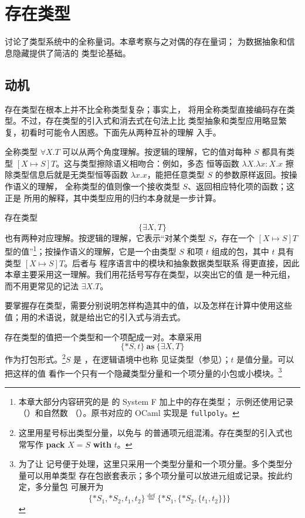 
\chapter{存在类型}
\label{chap:24}

讨论了类型系统中的全称量词。本章考察与之对偶的存在量词；
为数据抽象和信息隐藏提供了简洁的
类型论基础。

\section{动机}
\label{sec:24.1}

存在类型在根本上并不比全称类型复杂；事实上，
将用全称类型直接编码存在类型。不过，存在类型的引入式和消去式在句法上比
类型抽象和类型应用略显繁复，初看时可能令人困惑。下面先从两种互补的理解
入手。

全称类型 \(\forall X.T\) 可以从两个角度理解。按逻辑的理解，它的值对每种
\(S\) 都具有类型 \([X\mapsto S]T\)。这与类型擦除语义相吻合：例如，多态
恒等函数 \(\lambda X.\lambda x:X.x\) 擦除类型信息后就是无类型恒等函数
\(\lambda x.x\)，能把任意类型 \(S\) 的参数原样返回。按操作语义的理解，
全称类型的值则像一个接收类型 \(S\)、返回相应特化项的函数；这正是
所用的解释，其中类型应用的归约本身就是一步计算。

存在类型
\[
\{\exists X,T\}
\]
也有两种对应理解。按逻辑的理解，它表示“对某个类型 \(S\)，存在一个
\([X\mapsto S]T\) 型的值”\footnote{本章大部分内容研究的是
的 System F 加上中的存在类型；
示例还使用记录（）和自然数
（）。原书对应的
OCaml 实现是 \texttt{fullpoly}。}；按操作语义的理解，它是一个由类型
\(S\) 和项 \(t\) 组成的包，其中 \(t\) 具有类型 \([X\mapsto S]T\)。后者与
程序语言中的模块和抽象数据类型联系
得更直接，因此本章主要采用这一理解。我们用花括号写存在类型，以突出它的值
是一种元组，而不用更常见的记法 \(\exists X.T\)。

要掌握存在类型，需要分别说明怎样构造其中的值，以及怎样在计算中使用这些
值；用的术语说，就是给出它的引入式与消去式。

存在类型的值把一个类型和一个项配成一对。本章采用
\[
\{*S,t\}\ \textbf{as}\ \{\exists X,T\}
\]
作为打包形式。\footnote{这里用星号标出类型分量，以免与
的普通项元组混淆。存在类型的引入式也常写作
\textbf{pack} \(X=S\) \textbf{with} \(t\)。}\(S\) 是
，在逻辑语境中也称
见证类型（参见）；\(t\) 是值分量。可以把这样的值
看作一个只有一个隐藏类型分量和一个项分量的小包或小模块。\footnote{为了让
记号便于处理，这里只采用一个类型分量和一个项分量。多个类型分量可以用单类型
存在包嵌套表示；多个项分量可以放进元组或记录。按此约定，多分量包
可展开为
\[
\{*S_1,*S_2,t_1,t_2\}
\stackrel{\mathrm{def}}{=}
\{*S_1,\{*S_2,\{t_1,t_2\}\}\}
\]
}

